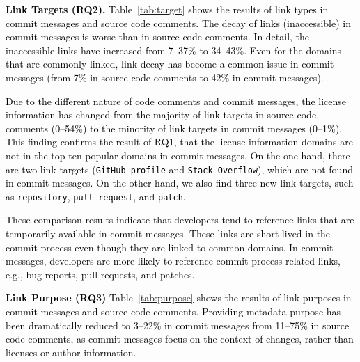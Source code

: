 \documentclass[smallextended]{svjour3}       %
\newcommand{\fix}[1]{\textcolor{black}{#1}}
\newcommand{\minor}[1]{\textcolor{black}{#1}}
\begin{document}
\fix{\textbf{Link Targets (RQ2).}
Table~\ref{tab:target} shows the results of link types in commit messages and source code comments. The decay of links (inaccessible) in commit messages is worse than in source code comments. In detail, the \minor{inaccessible} links have increased from 7--37\% to 34--43\%. Even for the domains that are commonly linked, link decay has become a common issue in commit messages (from 7\% in source code comments to 42\% in commit messages).}

\fix{Due to the different nature of code comments and commit messages, the license information has changed from the majority of link targets in source code comments (0--54\%) to the minority of link targets in commit messages (0--1\%). This finding confirms the result of RQ1, that the license information domains are not in the top ten popular domains in commit messages. On the one hand, there are two link targets (\texttt{GitHub profile} and \texttt{Stack Overflow}), which are not found in commit messages. On the other hand, we also find three new link targets, such as \texttt{repository}, \texttt{pull request}, and \texttt{patch}.}

\fix{These comparison results indicate that developers tend to reference links that are temporarily available in commit messages. These links are short-lived in the commit process even though they are linked to common domains. In commit messages, developers are more likely to reference commit process-related links, e.g., bug reports, pull requests, and patches.}


\fix{\textbf{Link Purpose (RQ3)}
Table~\ref{tab:purpose} shows the results of link purposes in commit messages and source code comments.
Providing metadata purpose has been dramatically reduced to 3--22\% in commit messages from 11--75\% in source code comments, as commit messages focus on the context of changes, rather than licenses or author information.} %
\end{document}
